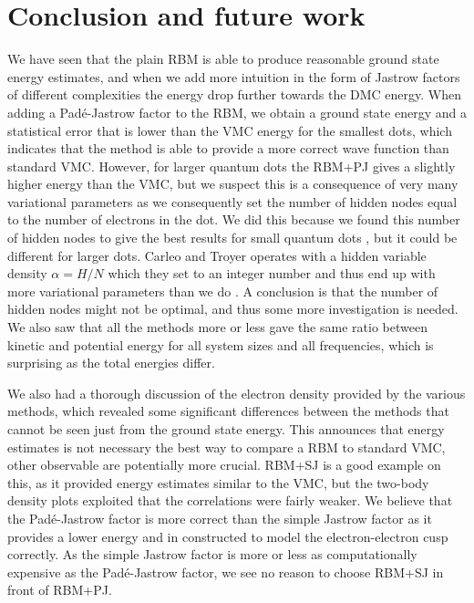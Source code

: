 \chapter{Conclusion and future work} \label{sec:conclusion}
We have seen that the plain RBM is able to produce reasonable ground state energy estimates, and when we add more intuition in the form of Jastrow factors of different complexities the energy drop further towards the DMC energy. When adding a Padé-Jastrow factor to the RBM, we obtain a ground state energy and a statistical error that is lower than the VMC energy for the smallest dots, which indicates that the method is able to provide a more correct wave function than standard VMC. However, for larger quantum dots the RBM+PJ gives a slightly higher energy than the VMC, but we suspect this is a consequence of very many variational parameters as we consequently set the number of hidden nodes equal to the number of electrons in the dot. We did this because we found this number of hidden nodes to give the best results for small quantum dots \cite{nordhagen_computational_2018}, but it could be different for larger dots. Carleo and Troyer operates with a hidden variable density $\alpha=H/N$ which they set to an integer number and thus end up with more variational parameters than we do \cite{carleo_solving_2017}. A conclusion is that the number of hidden nodes might not be optimal, and thus some more investigation is needed. We also saw that all the methods more or less gave the same ratio between kinetic and potential energy for all system sizes and all frequencies, which is surprising as the total energies differ.

We also had a thorough discussion of the electron density provided by the various methods, which revealed some significant differences between the methods that cannot be seen just from the ground state energy. This announces that energy estimates is not necessary the best way to compare a RBM to standard VMC, other observable are potentially more crucial. RBM+SJ is a good example on this, as it provided energy estimates similar to the VMC, but the two-body density plots exploited that the correlations were fairly weaker. We believe that the Padé-Jastrow factor is more correct than the simple Jastrow factor as it provides a lower energy and in constructed to model the electron-electron cusp correctly. As the simple Jastrow factor is more or less as computationally expensive as the Padé-Jastrow factor, we see no reason to choose RBM+SJ in front of RBM+PJ. 


